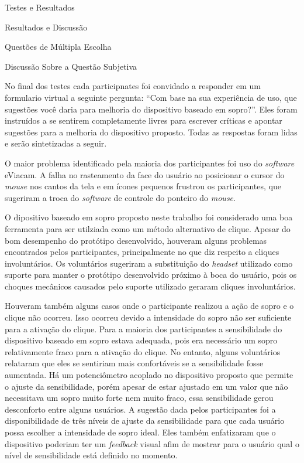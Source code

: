 \begin{chapter}{Testes e Resultados}
\begin{section}{Resultados e Discussão}
\begin{subsection}{Questões de Múltipla Escolha}
\end{subsection}

\begin{subsection}{Discussão Sobre a Questão Subjetiva}

No final dos testes cada participnates foi convidado a responder em um
formulario virtual a seguinte pergunta: ``Com base na sua experiência de uso,
que sugestões você daria para melhoria do dispositivo baseado em sopro?''. Eles 
foram instruídos a se sentirem completamente livres para escrever críticas e 
apontar sugestões para a melhoria do dispositivo proposto. Todas as respostas
foram lidas e serão sintetizadas a seguir.

O maior problema identificado pela maioria dos participantes foi uso do
\textit{software} eViacam. A falha no rasteamento da face do usuário ao
posicionar o cursor do \textit{mouse} nos cantos da tela e em ícones pequenos
frustrou os participantes, que sugeriram a troca do \textit{software} de
controle do ponteiro do \textit{mouse}.

O dipositivo baseado em sopro proposto neste trabalho foi considerado uma boa
ferramenta para ser utilziada como um método alternativo de clique. Apesar do
bom desempenho do protótipo desenvolvido, houveram alguns problemas encontrados
pelos participantes, principalmente no que diz respeito a cliques involuntários.
Os voluntários sugeriram a substituição do \textit{headset} utilizado como
suporte para manter o protótipo desenvolvido próximo à boca do usuário, pois os
choques mecânicos causados pelo suporte utilizado geraram cliques involuntários.

Houveram também alguns casos onde o participante realizou a ação de sopro e o
clique não ocorreu. Isso ocorreu devido a intensidade do sopro não ser
suficiente para a ativação do clique. Para a maioria dos participantes a
sensibilidade do dispositivo baseado em sopro estava adequada, pois era
necessário um sopro relativamente fraco para a ativação do clique. No entanto,
alguns voluntários relataram que eles se sentiriam mais confortáveis se a
sensibilidade fosse aumentada. Há um potenciômetro acoplado no dispositivo
proposto que permite o ajuste da sensibilidade, porém apesar de estar ajustado
em um valor que não necessitava um sopro muito forte nem muito fraco, essa
sensibilidade gerou desconforto entre alguns usuários. A sugestão dada pelos
participantes foi a disponibilidade de três níveis de ajuste da sensibilidade
para que cada usuário possa escolher a intensidade de sopro ideal. Eles também
enfatizaram que o  dispositivo poderiam ter um \textit{feedback} visual afim de
mostrar para o usuário qual o nível de sensibilidade está definido no momento.


\end{subsection}

\end{section}

\end{chapter}
